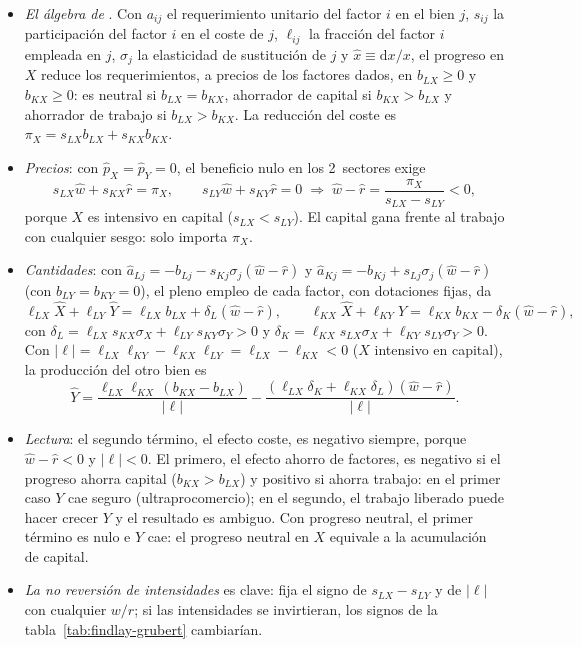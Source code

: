 \documentclass[11pt]{article}
\begin{document}
\begin{itemize}
\item \emph{El álgebra de }\nocite{Jones1965Structure} . Con $a_{ij}$ el requerimiento unitario del factor $i$ en el bien $j$, $s_{ij}$ la participación del factor $i$ en el coste de $j$, $\ell_{ij}$ la fracción del factor $i$ empleada en $j$, $\sigma_j$ la elasticidad de sustitución de $j$ y $\hat x\equiv\mathrm dx/x$, el progreso en $X$ reduce los requerimientos, a precios de los factores dados, en $b_{LX}\geq0$ y $b_{KX}\geq0$: es neutral si $b_{LX}=b_{KX}$, ahorrador de capital si $b_{KX}>b_{LX}$ y ahorrador de trabajo si $b_{LX}>b_{KX}$. La reducción del coste es $\pi_X=s_{LX}b_{LX}+s_{KX}b_{KX}$.
\item \emph{Precios}: con $\hat p_X=\hat p_Y=0$, el beneficio nulo en los 2~sectores exige
  \[
  s_{LX}\hat w+s_{KX}\hat r=\pi_X,\qquad s_{LY}\hat w+s_{KY}\hat r=0\;\Longrightarrow\;\hat w-\hat r=\frac{\pi_X}{s_{LX}-s_{LY}}<0,
  \]
  porque $X$ es intensivo en capital ($s_{LX}<s_{LY}$). El capital gana frente al trabajo con cualquier sesgo: solo importa $\pi_X$.
\item \emph{Cantidades}: con $\hat a_{Lj}=-b_{Lj}-s_{Kj}\sigma_j(\hat w-\hat r)$ y $\hat a_{Kj}=-b_{Kj}+s_{Lj}\sigma_j(\hat w-\hat r)$ (con $b_{LY}=b_{KY}=0$), el pleno empleo de cada factor, con dotaciones fijas, da
  \[
  \ell_{LX}\hat X+\ell_{LY}\hat Y=\ell_{LX}b_{LX}+\delta_L(\hat w-\hat r),\qquad \ell_{KX}\hat X+\ell_{KY}\hat Y=\ell_{KX}b_{KX}-\delta_K(\hat w-\hat r),
  \]
  con $\delta_L=\ell_{LX}s_{KX}\sigma_X+\ell_{LY}s_{KY}\sigma_Y>0$ y $\delta_K=\ell_{KX}s_{LX}\sigma_X+\ell_{KY}s_{LY}\sigma_Y>0$. Con $\lvert\ell\rvert=\ell_{LX}\ell_{KY}-\ell_{KX}\ell_{LY}=\ell_{LX}-\ell_{KX}<0$ ($X$ intensivo en capital), la producción del otro bien es
  \[
  \hat Y=\frac{\ell_{LX}\ell_{KX}\,(b_{KX}-b_{LX})}{\lvert\ell\rvert}-\frac{(\ell_{LX}\delta_K+\ell_{KX}\delta_L)(\hat w-\hat r)}{\lvert\ell\rvert}.
  \]
\item \emph{Lectura}: el segundo término, el efecto coste, es negativo siempre, porque $\hat w-\hat r<0$ y $\lvert\ell\rvert<0$. El primero, el efecto ahorro de factores, es negativo si el progreso ahorra capital ($b_{KX}>b_{LX}$) y positivo si ahorra trabajo: en el primer caso $Y$ cae seguro (ultraprocomercio); en el segundo, el trabajo liberado puede hacer crecer $Y$ y el resultado es ambiguo. Con progreso neutral, el primer término es nulo e $Y$ cae: el progreso neutral en $X$ equivale a la acumulación de capital.
\item \emph{La no reversión de intensidades} es clave: fija el signo de $s_{LX}-s_{LY}$ y de $\lvert\ell\rvert$ con cualquier $w/r$; si las intensidades se invirtieran, los signos de la tabla~\ref{tab:findlay-grubert} cambiarían.\findemo
\end{itemize}
\end{document}

